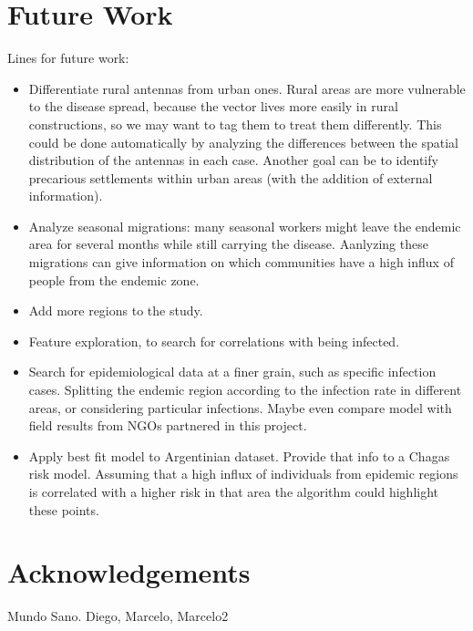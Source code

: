 \section{Future Work}
Lines for future work:
\begin{itemize}
    \item Differentiate rural antennas from urban ones. Rural areas are more vulnerable to the disease spread, because the vector lives more easily in rural constructions, so we may want to tag them to treat them differently. This could be done automatically by analyzing the differences between the spatial distribution of the antennas in each case. Another goal can be to identify precarious settlements within urban areas (with the addition of external information).
    \item Analyze seasonal migrations: many seasonal workers might leave the endemic area for several months while still carrying the disease. Aanlyzing these migrations can give information on which communities have a high influx of people from the endemic zone.
    \item Add more regions to the study.
    \item Feature exploration, to search for correlations with being infected.
    \item Search for epidemiological data at a finer grain, such as specific infection cases. Splitting the endemic region according to the infection rate in different areas, or considering particular infections. %
Maybe even compare model with field results from NGOs partnered in this project.
    \item Apply best fit model to Argentinian dataset. Provide that info to a Chagas risk model. Assuming that a high influx of individuals from epidemic regions is correlated with a higher risk in that area the algorithm could highlight these points. %
\end{itemize}

\section{Acknowledgements}
Mundo Sano. Diego, Marcelo, Marcelo2